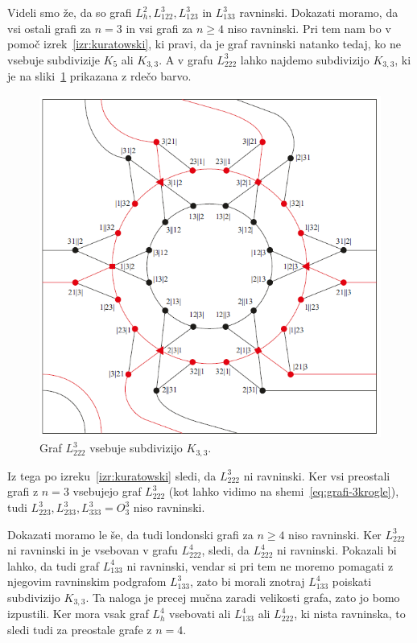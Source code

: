 \documentclass[12pt,a4paper]{amsart}
\theoremstyle{definition} %
\theoremstyle{plain} %
\begin{document}
\proof
    Videli smo že, da so grafi $L_h^2, L_{122}^3, L_{123}^3$ in $L_{133}^3$ ravninski. Dokazati moramo, da vsi ostali grafi za $n=3$ in vsi grafi za $n \geq 4$ niso ravninski. Pri tem nam bo v pomoč izrek~\ref{izr:kuratowski}, ki pravi, da je graf ravninski natanko tedaj, ko ne vsebuje subdivizije $K_5$ ali $K_{3,3}$. A v grafu $L_{222}^3$ lahko najdemo subdivizijo $K_{3,3}$, ki je na sliki~\ref{fig:L222-subdivizija} prikazana z rdečo barvo. 
    \begin{figure}[h]
        \centering
        \includegraphics[width=400pt]{img/tolgraph-O^3_222-subdivision.png}
        \caption{Graf $L_{222}^3$ vsebuje subdivizijo $K_{3,3}$.}
        \label{fig:L222-subdivizija}
    \end{figure}
    Iz tega po izreku~\ref{izr:kuratowski} sledi, da $L_{222}^3$ ni ravninski. Ker vsi preostali grafi z $n = 3$ vsebujejo graf $L_{222}^3$ (kot lahko vidimo na shemi~\eqref{eq:grafi-3krogle}), tudi $L_{223}^3, L_{233}^3, L_{333}^3=O^3_3$ niso ravninski.
    
    Dokazati moramo le še, da tudi londonski grafi za $n\geq 4$ niso ravninski.
    Ker $L_{222}^3$ ni ravninski in je vsebovan v grafu $L_{222}^4$, sledi, da $L_{222}^4$ ni ravninski. Pokazali bi lahko, da tudi graf $L_{133}^4$ ni ravninski, vendar si pri tem ne moremo pomagati z njegovim ravninskim podgrafom $L_{133}^3$, zato bi morali znotraj $L_{133}^4$ poiskati subdivizijo $K_{3,3}$. Ta naloga je precej mučna zaradi velikosti grafa, zato jo bomo izpustili.
    Ker mora vsak graf $L_h^4$ vsebovati ali $L_{133}^4$ ali $L_{222}^4$, ki nista ravninska, to sledi tudi za preostale grafe z $n=4$.
    
\end{document}
